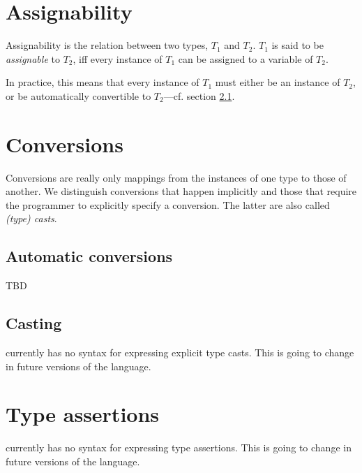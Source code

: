 \section{Assignability}

Assignability is the relation between two types, $T_1$ and $T_2$.
$T_1$ is said to be {\em assignable} to $T_2$, iff every instance of
$T_1$ can be assigned to a variable of $T_2$.

In practice, this means that every instance of $T_1$ must either be an
instance of $T_2$, or be automatically convertible to $T_2$---cf.
section \ref{sect:AutomaticConversions}.

\section{Conversions}

Conversions are really only mappings from the instances of one type to
those of another. We distinguish conversions that happen implicitly
and those that require the programmer to explicitly specify a
conversion. The latter are also called {\em (type) casts}.

\subsection{Automatic conversions}\label{sect:AutomaticConversions}

TBD

\subsection{Casting}

\Cal currently has no syntax for expressing explicit type casts. This
is going to change in future versions of the language.

\section{Type assertions}

\Cal currently has no syntax for expressing type assertions. This is
going to change in future versions of the language.






